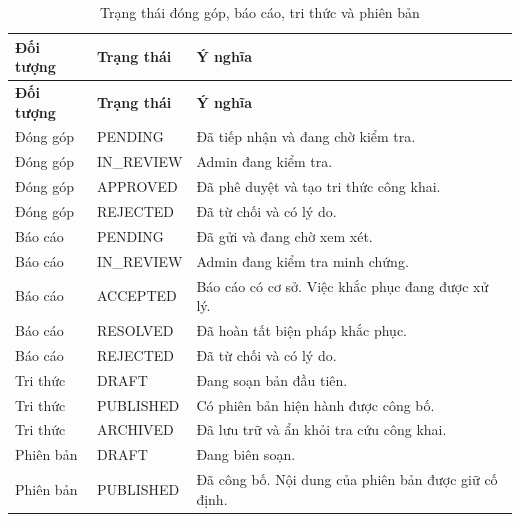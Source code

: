 \begin{longtable}{|L{24mm}|L{30mm}|L{85mm}|}
\caption{Trạng thái đóng góp, báo cáo, tri thức và phiên bản}\label{tab:chapter3-status}\\\hline
{}\textbf{Đối tượng} & \textbf{Trạng thái} & \textbf{Ý nghĩa}\\\hline
\endfirsthead
\hline
{}\textbf{Đối tượng} & \textbf{Trạng thái} & \textbf{Ý nghĩa}\\\hline
\endhead
\endfoot
Đóng góp & PENDING & Đã tiếp nhận và đang chờ kiểm tra.\\\hline
Đóng góp & IN\_REVIEW & Admin đang kiểm tra.\\\hline
Đóng góp & APPROVED & Đã phê duyệt và tạo tri thức công khai.\\\hline
Đóng góp & REJECTED & Đã từ chối và có lý do.\\\hline
Báo cáo & PENDING & Đã gửi và đang chờ xem xét.\\\hline
Báo cáo & IN\_REVIEW & Admin đang kiểm tra minh chứng.\\\hline
Báo cáo & ACCEPTED & Báo cáo có cơ sở. Việc khắc phục đang được xử lý.\\\hline
Báo cáo & RESOLVED & Đã hoàn tất biện pháp khắc phục.\\\hline
Báo cáo & REJECTED & Đã từ chối và có lý do.\\\hline
Tri thức & DRAFT & Đang soạn bản đầu tiên.\\\hline
Tri thức & PUBLISHED & Có phiên bản hiện hành được công bố.\\\hline
Tri thức & ARCHIVED & Đã lưu trữ và ẩn khỏi tra cứu công khai.\\\hline
Phiên bản & DRAFT & Đang biên soạn.\\\hline
Phiên bản & PUBLISHED & Đã công bố. Nội dung của phiên bản được giữ cố định.\\\hline
\end{longtable}

